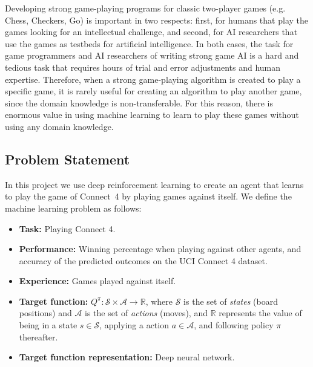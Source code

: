\documentclass{article}
\begin{document}
Developing strong game-playing programs for classic two-player games (e.g. Chess, Checkers, Go) is
important in two respects: first, for humans that play the games looking for an intellectual
challenge, and second, for AI researchers that use the games as testbeds for artificial
intelligence. In both cases, the task for game programmers and AI researchers of writing strong game
AI is a hard and tedious task that requires hours of trial and error adjustments and human
expertise. Therefore, when a strong game-playing algorithm is created to play a specific game, it is
rarely useful for creating an algorithm to play another game, since the domain knowledge is
non-transferable. For this reason, there is enormous value in using machine learning to learn to
play these games without using any domain knowledge.

\subsection{Problem Statement}
\label{sec:problem-statement}

\newcommand{\URLcf}{https://en.wikipedia.org/wiki/Connect_Four}

In this project we use deep reinforcement learning to create an agent that learns to play the game
of \mbox{Connect 4} by playing games against itself. We define the machine learning problem as
follows:

\begin{itemize}

    \item \textbf{Task:} Playing Connect 4.

    \item \textbf{Performance:} Winning percentage when playing against other agents, and accuracy
        of the predicted outcomes on the UCI Connect 4 dataset.

    \item \textbf{Experience:} Games played against itself.

    \item \textbf{Target function:} $Q^\pi : \mathcal{S} \times \mathcal{A} \to \mathbb{R}$, where
        $\mathcal{S}$ is the set of \emph{states} (board positions) and $\mathcal{A}$ is the set of
        \emph{actions} (moves), and $\mathbb{R}$ represents the value of being in a state $s \in
        \mathcal{S}$, applying a action $a \in \mathcal{A}$, and following policy $\pi$ thereafter.

    \item \textbf{Target function representation:} Deep neural network.

\end{itemize}
\end{document}
